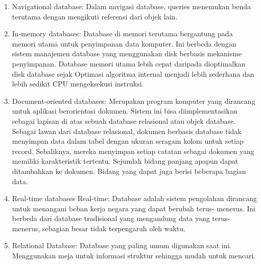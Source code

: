 \begin{enumerate}
		\item Navigational database: 
			Dalam navigasi database, queries menemukan benda terutama dengan mengikuti referensi dari objek lain.
 
		\item In-memory databases: 
			Database di memori terutama bergantung pada memori utama untuk penyimpanan data komputer. Ini berbeda dengan sistem manajemen database yang menggunakan disk berbasis mekanisme penyimpanan. Database memori utama lebih cepat daripada dioptimalkan disk database sejak Optimasi algoritma internal menjadi lebih sederhana dan lebih sedikit CPU mengeksekusi instruksi.

		\item Document-oriented databases: 
			Merupakan program komputer yang dirancang untuk aplikasi berorientasi dokumen. Sistem ini bisa diimplementasikan sebagai lapisan di atas sebuah database relasional atau objek database. Sebagai lawan dari database relasional, dokumen berbasis database tidak menyimpan data dalam tabel dengan ukuran seragam kolom untuk setiap record. Sebaliknya, mereka menyimpan setiap catatan sebagai dokumen yang memiliki karakteristik tertentu. Sejumlah bidang panjang apapun dapat ditambahkan ke dokumen. Bidang yang dapat juga berisi beberapa bagian data. 
 
		\item Real-time databases Real-time: 
			Database adalah sistem pengolahan dirancang untuk menangani beban kerja negara yang dapat berubah terus- menerus. Ini berbeda dari database tradisional yang mengandung data yang terus- menerus, sebagian besar tidak terpengaruh oleh waktu. 
 
		\item Relational Database: 
			Database yang paling umum digunakan saat ini. Menggunakan meja untuk informasi struktur sehingga mudah untuk mencari.
	\end{enumerate}
 
 
